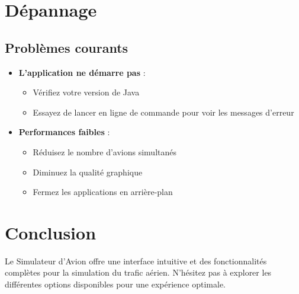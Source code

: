 \documentclass[12pt,a4paper]{article}
\begin{document}
\section{Dépannage}

\subsection{Problèmes courants}
\begin{itemize}
    \item \textbf{L'application ne démarre pas} :
    \begin{itemize}
        \item Vérifiez votre version de Java
        \item Essayez de lancer en ligne de commande pour voir les messages d'erreur
    \end{itemize}
    \item \textbf{Performances faibles} :
    \begin{itemize}
        \item Réduisez le nombre d'avions simultanés
        \item Diminuez la qualité graphique
        \item Fermez les applications en arrière-plan
    \end{itemize}
\end{itemize}

\section{Conclusion}
Le Simulateur d'Avion offre une interface intuitive et des fonctionnalités complètes pour la simulation du trafic aérien. N'hésitez pas à explorer les différentes options disponibles pour une expérience optimale.
\end{document}
